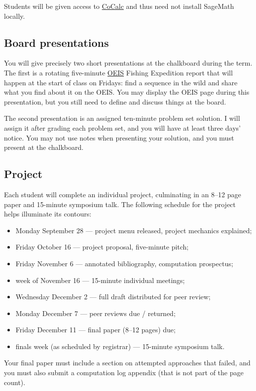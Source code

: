 \documentclass[11pt,twoside]{amsart}
\begin{document}
Students will be given access to \href{https://cocalc.ai/}{CoCalc} and thus need not install SageMath locally.

\subsection*{Board presentations}
You will give precisely two short presentations at the chalkboard during the term. The first is a rotating five-minute \href{https://oeis.org/}{OEIS} Fishing Expedition report that will happen at the start of class on Fridays: find a sequence in the wild and share what you find about it on the OEIS. You may display the OEIS page during this presentation, but you still need to define and discuss things at the board.

The second presentation is an assigned ten-minute problem set solution. I will assign it after grading each problem set, and you will have at least three days' notice. You may not use notes when presenting your solution, and you must present at the chalkboard.

\subsection*{Project}
Each student will complete an individual project, culminating in an 8--12 page paper and 15-minute symposium talk. The following schedule for the project helps illuminate its contours:
\begin{itemize}
  \item Monday September 28 --- project menu released, project mechanics explained;
  \item Friday October 16 --- project proposal, five-minute pitch;
  \item Friday November 6 --- annotated bibliography, computation prospectus;
  \item week of November 16 --- 15-minute individual meetings;
  \item Wednesday December 2 --- full draft distributed for peer review;
  \item Monday December 7 --- peer reviews due / returned;
  \item Friday December 11 --- final paper (8--12 pages) due;
  \item finals week (as scheduled by registrar) --- 15-minute symposium talk.
\end{itemize}

Your final paper must include a section on attempted approaches that failed, and you must also submit a computation log appendix (that is not part of the page count).
\end{document}
